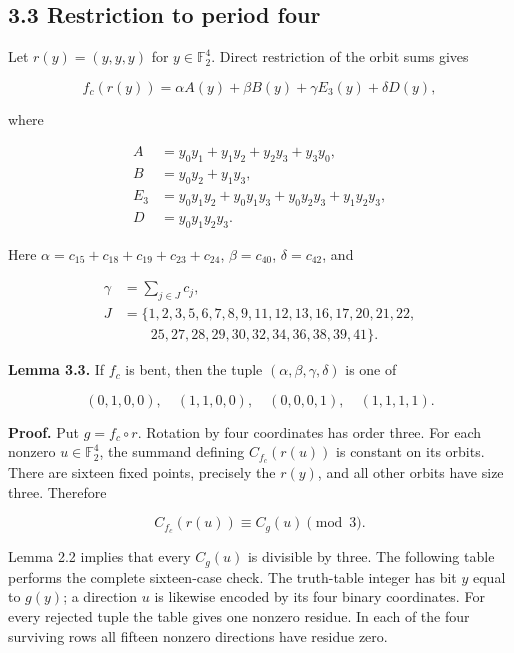 \documentclass[11pt,a4paper]{article}
\begin{document}
\subsection*{3.3 Restriction to period four}

Let $r(y)=(y,y,y)$ for $y\in\mathbb F_2^4$. Direct restriction of the orbit sums gives

\[
f_c(r(y))=\alpha A(y)+\beta B(y)+\gamma E_3(y)+\delta D(y), \tag{3.4}
\]

where

\[
\begin{aligned}
A&=y_0y_1+y_1y_2+y_2y_3+y_3y_0,\\
B&=y_0y_2+y_1y_3,\\
E_3&=y_0y_1y_2+y_0y_1y_3+y_0y_2y_3+y_1y_2y_3,\\
D&=y_0y_1y_2y_3.
\end{aligned}
\]

Here $\alpha=c_{15}+c_{18}+c_{19}+c_{23}+c_{24}$, $\beta=c_{40}$, $\delta=c_{42}$, and

\[
\begin{aligned}\gamma&=\sum_{j\in J}c_j,\\J&=\{1,2,3,5,6,7,8,9,11,12,13,16,17,20,21,22,\\&\qquad25,27,28,29,30,32,34,36,38,39,41\}.\end{aligned} \tag{3.5}
\]

\textbf{Lemma 3.3.} If $f_c$ is bent, then the tuple $(\alpha,\beta,\gamma,\delta)$ is one of

\[
(0,1,0,0),\quad(1,1,0,0),\quad(0,0,0,1),\quad(1,1,1,1). \tag{3.6}
\]

\textbf{Proof.} Put $g=f_c\circ r$. Rotation by four coordinates has order three. For each nonzero $u\in\mathbb F_2^4$, the summand defining $C_{f_c}(r(u))$ is constant on its orbits. There are sixteen fixed points, precisely the $r(y)$, and all other orbits have size three. Therefore

\[
C_{f_c}(r(u))\equiv C_g(u)\pmod3. \tag{3.7}
\]

Lemma 2.2 implies that every $C_g(u)$ is divisible by three. The following table performs the complete sixteen-case check. The truth-table integer has bit $y$ equal to $g(y)$; a direction $u$ is likewise encoded by its four binary coordinates. For every rejected tuple the table gives one nonzero residue. In each of the four surviving rows all fifteen nonzero directions have residue zero.
\end{document}
